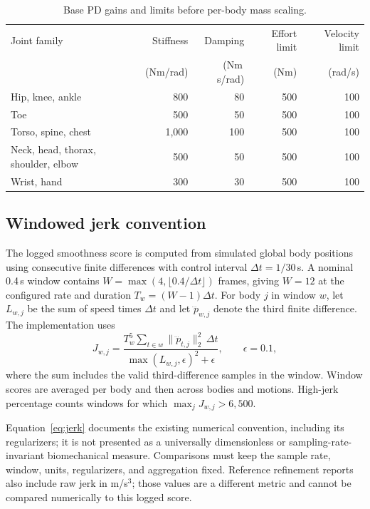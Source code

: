 \begin{table}[htbp]
\centering
\small
\caption{Base PD gains and limits before per-body mass scaling.}\label{tab:pd_parameters}
\begin{tabular}{lrrrr}
\toprule
Joint family & Stiffness & Damping & Effort limit & Velocity limit \\
 & (Nm/rad) & (Nm\,s/rad) & (Nm) & (rad/s) \\
\midrule
Hip, knee, ankle & 800 & 80 & 500 & 100 \\
Toe & 500 & 50 & 500 & 100 \\
Torso, spine, chest & 1,000 & 100 & 500 & 100 \\
Neck, head, thorax, shoulder, elbow & 500 & 50 & 500 & 100 \\
Wrist, hand & 300 & 30 & 500 & 100 \\
\bottomrule
\end{tabular}
\end{table}

\subsection{Windowed jerk convention}\label{app:smoothness}

The logged smoothness score is computed from simulated global body positions
using consecutive finite differences with control interval
$\Delta t=1/30$\,s. A nominal 0.4\,s window contains
$W=\max(4,\lfloor0.4/\Delta t\rfloor)$ frames, giving $W=12$ at the
configured rate and duration $T_w=(W-1)\Delta t$. For body $j$ in window $w$,
let $L_{w,j}$ be the sum of speed times $\Delta t$ and let
$\dddot{p}_{w,j}$ denote the third finite difference. The implementation uses
\begin{equation}
    J_{w,j} =
    \frac{T_w^5
      \sum_{t\in w}\|\dddot{p}_{t,j}\|_2^2\,\Delta t}
    {\max(L_{w,j},\epsilon)^2+\epsilon},
    \qquad \epsilon=0.1,
    \label{eq:jerk}
\end{equation}
where the sum includes the valid third-difference samples in the window.
Window scores are averaged per body and then across bodies and motions.
High-jerk percentage counts windows for which
$\max_j J_{w,j}>6{,}500$.

Equation~\eqref{eq:jerk} documents the existing numerical convention, including
its regularizers; it is not presented as a universally dimensionless or
sampling-rate-invariant biomechanical measure. Comparisons must keep the
sample rate, window, units, regularizers, and aggregation fixed. Reference
refinement reports also include raw jerk in m/s$^3$; those values are a
different metric and cannot be compared numerically to this logged score.

